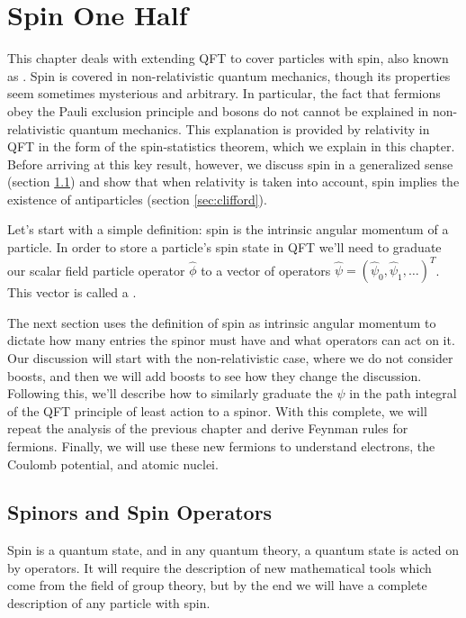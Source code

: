 \chapter{Spin One Half}
\label{chap:spin-one-half}

\noindent This chapter deals with extending QFT to cover particles with spin, also known as . Spin is covered in non-relativistic quantum mechanics, though its properties seem sometimes mysterious and arbitrary. In particular, the fact that fermions obey the Pauli exclusion principle and bosons do not cannot be explained in non-relativistic quantum mechanics. This explanation is provided by relativity in QFT in the form of the spin-statistics theorem, which we explain in this chapter. Before arriving at this key result, however, we discuss spin in a generalized sense (section \ref{sec:non-rel-spin}) and show that when relativity is taken into account, spin implies the existence of antiparticles (section \ref{sec:clifford}).

Let's start with a simple definition: spin is the intrinsic angular momentum of a particle. In order to store a particle's spin state in QFT we'll need to graduate our scalar field particle operator $\hat \phi$ to a vector of operators $\hat \psi = (\hat \psi_0, \hat \psi_1,\dots)^T$. This vector is called a .

The next section uses the definition of spin as intrinsic angular momentum to dictate how many entries the spinor must have and what operators can act on it. Our discussion will start with the non-relativistic case, where we do not consider boosts, and then we will add boosts to see how they change the discussion. Following this, we'll describe how to similarly graduate the $\psi$ in the path integral of the QFT principle of least action to a spinor. With this complete, we will repeat the analysis of the previous chapter and derive Feynman rules for fermions. Finally, we will use these new fermions to understand electrons, the Coulomb potential, and atomic nuclei.

\section{Spinors and Spin Operators}
\label{sec:non-rel-spin}

Spin is a quantum state, and in any quantum theory, a quantum state is acted on by operators. It will require the description of new mathematical tools which come from the field of group theory, but by the end we will have a complete description of any particle with spin.

